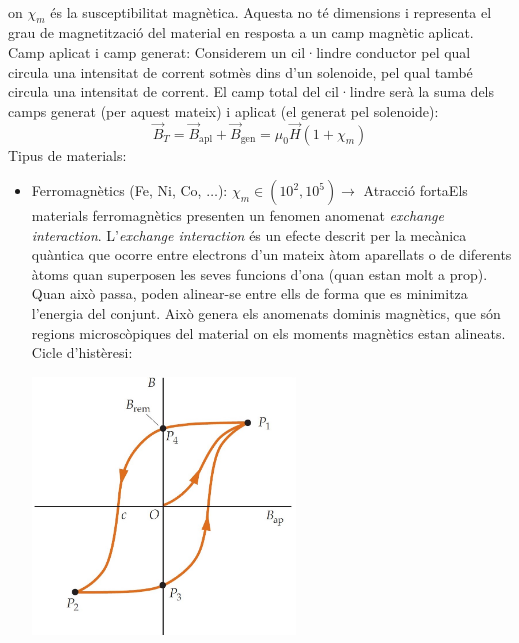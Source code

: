 \documentclass[../../../main.tex]{subfiles}
\begin{document}
\begin{multicols}{2}
\begin{gather*}
    \end{gather*}
    {on $\chi_m$ és la susceptibilitat magnètica. Aquesta no té dimensions i representa el grau de magnetització del material en resposta a un camp magnètic aplicat.}\newline
    Camp aplicat i camp generat: Considerem un cil·lindre conductor pel qual circula una intensitat de corrent sotmès dins d'un solenoide, pel qual també circula una intensitat de corrent. El camp total del cil·lindre serà la suma dels camps generat (per aquest mateix) i aplicat (el generat pel solenoide): $$\Vec{B}_T=\Vec{B}_{\text{apl}}+\Vec{B}_{\text{gen}}=\mu_0\Vec{H}(1+\chi_m)$$
    Tipus de materials:
    \begin{itemize}
        \item Ferromagnètics (Fe, Ni, Co, $\ldots$): $\chi_m\in(10^2,10^5)\rightarrow$ Atracció forta\newline Els materials ferromagnètics presenten un fenomen anomenat \textit{exchange interaction}. L'\textit{exchange interaction} és un efecte descrit per la mecànica quàntica que ocorre entre electrons d’un mateix àtom aparellats o de diferents àtoms quan superposen les seves funcions d’ona (quan estan molt a prop). Quan això passa, poden alinear-se entre ells de forma que es minimitza l’energia del conjunt. Això genera els anomenats dominis magnètics, que són regions microscòpiques del material on els moments magnètics estan alineats.\newline
              Cicle d'histèresi:\newline
              \begin{minipage}{\linewidth}
                  \centering
                  \includegraphics[width=7cm]{Physics/1st/Electricity_and_magnetism/Images/hist.jpg}

\end{minipage}
\end{itemize}
\end{multicols}
\end{document}
